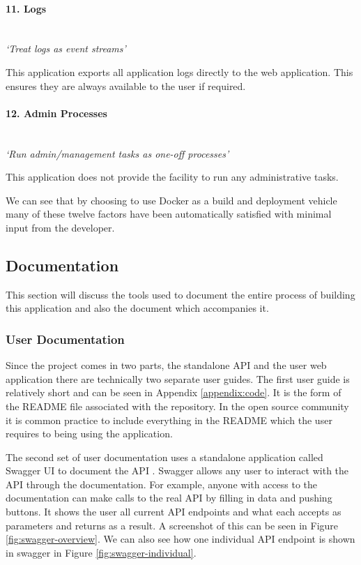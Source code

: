 \paragraph{11. Logs}\mbox{}\\
\textit{`Treat logs as event streams'}

This application exports all application logs directly to the web application. This ensures they are always available to the user if required.

\paragraph{12. Admin Processes}\mbox{}\\
\textit{`Run admin/management tasks as one-off processes'}

This application does not provide the facility to run any administrative tasks.

We can see that by choosing to use Docker as a build and deployment vehicle many of these twelve factors have been automatically satisfied with minimal input from the developer.

\subsection{Documentation}
This section will discuss the tools used to document the entire process of building this application and also the document which accompanies it.
\subsubsection{User Documentation}
Since the project comes in two parts, the standalone API and the user web application there are technically two separate user guides. The first user guide is relatively short and can be seen in Appendix \ref{appendix:code}. It is the form of the README file associated with the repository. In the open source community it is common practice to include everything in the README which the user requires to being using the application. 

The second set of user documentation uses a standalone application called Swagger UI to document the API \citep{Swagger2017}. Swagger allows any user to interact with the API through the documentation. For example, anyone with access to the documentation can make calls to the real API by filling in data and pushing buttons. It shows the user all current API endpoints and what each accepts as parameters and returns as a result. A screenshot of this can be seen in Figure \ref{fig:swagger-overview}. We can also see how one individual API endpoint is shown in swagger in Figure \ref{fig:swagger-individual}.


